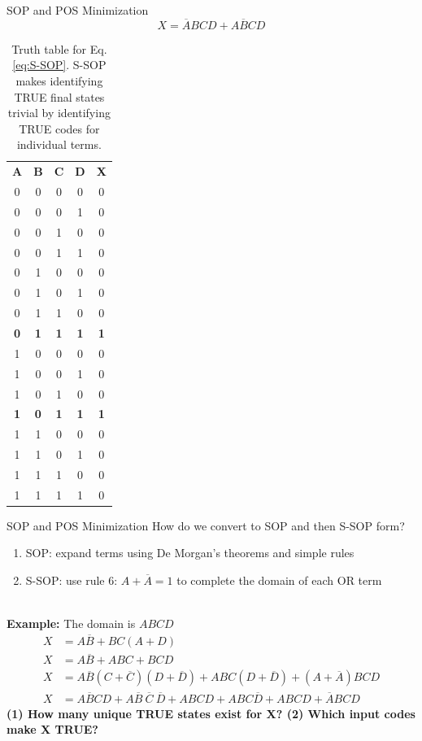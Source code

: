 \documentclass{beamer}
\begin{document}
\begin{frame}{SOP and POS Minimization}
\begin{equation}
X = \overline{A}BCD+A\overline{B}CD \label{eq:S-SOP}
\end{equation}
\tiny
\begin{table}
\begin{tabular}{c c c c c}
\textbf{A} & \textbf{B} & \textbf{C} & \textbf{D} & \textbf{X} \\
0 & 0 & 0 & 0 & 0 \\
0 & 0 & 0 & 1 & 0 \\
0 & 0 & 1 & 0 & 0 \\
0 & 0 & 1 & 1 & 0 \\
0 & 1 & 0 & 0 & 0 \\
0 & 1 & 0 & 1 & 0 \\
0 & 1 & 1 & 0 & 0 \\ \hline
\textbf{0} & \textbf{1} & \textbf{1} & \textbf{1} & \textbf{1} \\ \hline
1 & 0 & 0 & 0 & 0 \\
1 & 0 & 0 & 1 & 0 \\
1 & 0 & 1 & 0 & 0 \\ \hline
\textbf{1} & \textbf{0} & \textbf{1} & \textbf{1} & \textbf{1} \\ \hline
1 & 1 & 0 & 0 & 0 \\
1 & 1 & 0 & 1 & 0 \\
1 & 1 & 1 & 0 & 0 \\
1 & 1 & 1 & 1 & 0 \\
\end{tabular}
\caption{\label{tab:TT1} Truth table for Eq. \ref{eq:S-SOP}. S-SOP makes identifying TRUE final states trivial by identifying TRUE codes for individual terms.}
\end{table}
\end{frame}

\begin{frame}{SOP and POS Minimization}
\small
How do we convert to SOP and then S-SOP form?
\begin{enumerate}
\item SOP: expand terms using De Morgan's theorems and simple rules
\item S-SOP: use rule 6: $A+\overline{A} = 1$ to complete the domain of each OR term
\end{enumerate} \hrulefill \\
\textbf{Example:} The domain is $ABCD$
\begin{align}
X &= A\overline{B}+BC(A+D) \\
X &= A\overline{B}+ABC+BCD \\
X &= A\overline{B}(C+\overline{C})(D+\overline{D}) + ABC(D+\overline{D}) + (A+\overline{A})BCD \\
X &= A\overline{B}CD+A\overline{B}~\overline{C}~\overline{D} + ABCD+ABC\overline{D} + ABCD+\overline{A}BCD \label{eq:S-SOP2}
\end{align}
\textbf{(1) How many unique TRUE states exist for X? (2) Which input codes make X TRUE?}
\end{frame}
\end{document}
